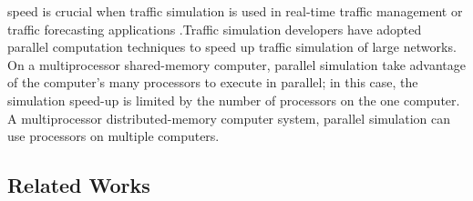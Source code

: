  speed is crucial when traffic simulation is used in real-time traffic management or traffic forecasting applications \cite{lee2002framework}.Traffic simulation developers have adopted parallel computation techniques to speed up traffic simulation of large networks. On a multiprocessor shared-memory computer, parallel simulation take advantage of the computer's many processors to execute in parallel; in this case, the simulation speed-up is limited by the number of processors on the one computer. A multiprocessor distributed-memory computer system, parallel simulation can use processors on multiple computers.

\subsection{Related Works}

